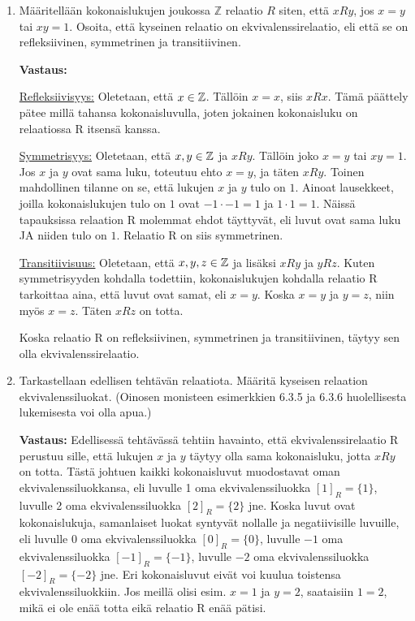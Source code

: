 \documentclass[a4paper,12pt]{article}
\begin{document}
\begin{enumerate}
\item M\"a\"aritell\"a\"an kokonaislukujen joukossa $\mathbb{Z}$ relaatio $R$ siten, ett\"a $xRy$, jos $x=y$ tai $xy=1$.
Osoita, ett\"a kyseinen relaatio on ekvivalenssirelaatio, eli ett\"a se on refleksiivinen, symmetrinen ja transitiivinen.

\textbf{Vastaus:}

\underline{Refleksiivisyys:} Oletetaan, että $x\in \mathbb{Z}$. Tällöin $x=x$, siis $xRx$. Tämä päättely pätee millä tahansa kokonaisluvulla, joten jokainen kokonaisluku on relaatiossa R itsensä kanssa. 

\underline{Symmetrisyys:} Oletetaan, että $x, y \in \mathbb{Z}$ ja $xRy$. Tällöin joko $x=y$ tai $xy=1$. Jos $x$ ja $y$ ovat sama luku, toteutuu ehto $x=y$, ja täten $xRy$. Toinen mahdollinen tilanne on se, että lukujen $x$ ja $y$ tulo on $1$. Ainoat lausekkeet, joilla kokonaislukujen tulo on $1$ ovat $-1\cdot-1=1$ ja $1\cdot 1=1$. Näissä tapauksissa relaation R molemmat ehdot täyttyvät, eli luvut ovat sama luku JA niiden tulo on $1$. Relaatio R on siis symmetrinen. 

\underline{Transitiivisuus:} Oletetaan, että $x,y,z \in \mathbb{Z}$ ja lisäksi $xRy$ ja $yRz$. Kuten symmetrisyyden kohdalla todettiin, kokonaislukujen kohdalla relaatio R tarkoittaa aina, että luvut ovat samat, eli $x=y$. Koska $x=y$ ja $y=z$, niin myös $x=z$. Täten $xRz$ on totta. 

Koska relaatio R on refleksiivinen, symmetrinen ja transitiivinen, täytyy sen olla ekvivalenssirelaatio. \vspace{1em}

\item Tarkastellaan edellisen teht\"av\"an relaatiota. 
M\"a\"arit\"a kyseisen relaation ekvivalenssiluokat. (Oinosen monisteen esimerkkien 6.3.5 ja 6.3.6 huolellisesta lukemisesta voi olla apua.)

\textbf{Vastaus:} Edellisessä tehtävässä tehtiin havainto, että ekvivalenssirelaatio R perustuu sille, että lukujen $x$ ja $y$ täytyy olla sama kokonaisluku, jotta $xRy$ on totta. Tästä johtuen kaikki kokonaisluvut muodostavat oman ekvivalenssiluokkansa, eli luvulle 1 oma ekvivalenssiluokka $[1]_R=\{1\}$, luvulle 2 oma ekvivalenssiluokka $[2]_R=\{2\}$ jne. Koska luvut ovat kokonaislukuja, samanlaiset luokat syntyvät nollalle ja negatiivisille luvuille, eli luvulle $0$ oma ekvivalenssiluokka $[0]_R=\{0\}$, luvulle $-1$ oma ekvivalenssiluokka $[-1]_R=\{-1\}$, luvulle $-2$ oma ekvivalenssiluokka $[-2]_R=\{-2\}$ jne. Eri kokonaisluvut eivät voi kuulua toistensa ekvivalenssiluokkiin. Jos meillä olisi esim. $x=1$ ja $y=2$, saataisiin $1=2$, mikä ei ole enää totta eikä relaatio R enää pätisi. 


\end{enumerate}
\end{document}
